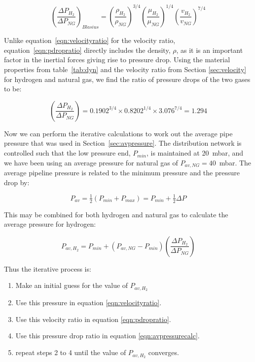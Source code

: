 \documentclass[5p]{elsarticle} %
\begin{document}
\begin{equation}
\label{eqn:pdropratio}
    \left(\frac{\Delta P_{H_2}}{\Delta P_{NG}}\right)_{Blasius} = 
    \left(\frac{\rho_{H_2}}{\rho_{NG}}\right)^{3/4} 
    \left(\frac{\mu_{H_2}}{\mu_{NG}}\right)^{1/4} 
    \left(\frac{v_{H_2}}{v_{NG}}\right)^{7/4}
\end{equation}

Unlike equation~\eqref{eqn:velocityratio} for the velocity ratio, equation~\eqref{eqn:pdropratio} directly includes the density, $\rho$, as it is an important factor in the inertial forces giving rise to pressure drop.
Using the material properties from table~\ref{tab:dyn} and the velocity ratio from Section \ref{sec:velocity} for hydrogen and natural gas, we find the ratio of pressure drops of the two gases to be:

\begin{equation}
\label{eqn:pdropratiovalue}
    \left(\frac{\Delta P_{H_2}}{\Delta P_{NG}}\right) = 
    0.1902^{3/4} \times 0.8202^{1/4} \times 3.076^{7/4} = \mathbf{1.294}
\end{equation}

Now we can perform the iterative calculations to work out the average pipe pressure that was used in Section~\ref{sec:avpressure}. 
The distribution network is controlled such that the low pressure end, $P_{min}$, is maintained at 20~mbar\citep{dodds2013}, and we have been using an average pressure for natural gas of $P_{av,NG}=40$~mbar\citep{utonomy23}.
The average pipeline pressure is related to the minimum pressure and the pressure drop by:

\begin{equation}
    \label{eqn:avpressure}
    P_{av} = \tfrac{1}{2}(P_{min}+P_{max}) = P_{min} + \tfrac{1}{2} \Delta P
\end{equation}

This may be combined for both hydrogen and natural gas to calculate the average pressure for hydrogen:

\begin{equation}
    \label{eqn:avpressurecalc}
    P_{av,H_2} = P_{min} + ( P_{av,NG} - P_{min} ) \left(\frac{\Delta P_{H_2}}{\Delta P_{NG}}\right)
\end{equation}

Thus the iterative process is:
\begin{enumerate}
    \item Make an initial guess for the value of $P_{av,H_2}$
    \item Use this pressure in equation \eqref{eqn:velocityratio}.
    \item Use this velocity ratio in equation \eqref{eqn:pdropratio}.
    \item Use this pressure drop ratio in equation \eqref{eqn:avpressurecalc}.
    \item repeat steps 2 to 4 until the value of $P_{av,H_2}$ converges.
\end{enumerate}
\end{document}
